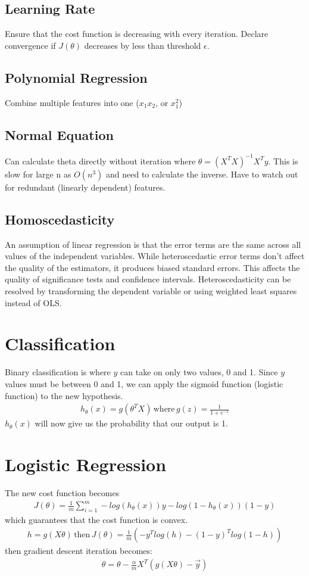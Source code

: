 \documentclass[12pt]{article}
\begin{document}
\subsection{Learning Rate}
Ensure that the cost function is decreasing with every iteration. Declare convergence if $J(\theta)$ decreases by less than threshold $\epsilon$.

\subsection{Polynomial Regression}
Combine multiple features into one ($x_1x_2$, or $x_1^2$)

\subsection{Normal Equation}
Can calculate theta directly without iteration where $\theta = (X^TX)^{-1}X^Ty$. This is slow for large n as $O(n^3)$ and need to calculate the inverse. Have to watch out for redundant (linearly dependent) features.

\subsection{Homoscedasticity}
An assumption of linear regression is that the error terms are the same across all values of the independent variables. While heteroscedastic error terms don't affect the quality of the estimators, it produces biased standard errors. This affects the quality of significance tests and confidence intervals. Heteroscedasticity can be resolved by transforming the dependent variable or using weighted least squares instead of OLS.

\section{Classification}
Binary classification is where $y$ can take on only two values, 0 and 1. Since $y$ values must be between 0 and 1, we can apply the sigmoid function (logistic function) to the new hypothesis.
\begin{align*}
	h_\theta (x)=g(\theta^TX)\,\text{where}\, g(z) = \frac{1}{1+e^{-z}}
\end{align*}
$h_\theta (x)$ will now give us the probability that our output is 1.

\section{Logistic Regression}
The new cost function becomes 
\begin{align*}
	J(\theta)=\frac{1}{m}\sum_{i=1}^{m}-log(h_\theta (x))y-log(1-h_\theta (x))(1-y)
\end{align*}
which guarantees that the cost function is convex.
\begin{align*}
	h = g(X\theta) \,\text{then}\, J(\theta)=\frac{1}{m}(-y^Tlog(h)-(1-y)^Tlog(1-h))
\end{align*}
then gradient descent iteration becomes:
\begin{align*}
	\theta = \theta - \frac{\alpha}{m}X^T(g(X\theta)-\overrightarrow{y})
\end{align*}
\end{document}
